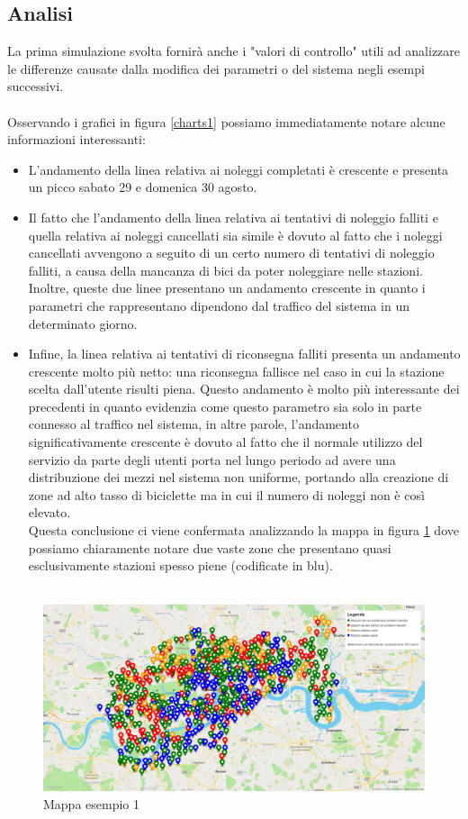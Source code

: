 \documentclass[a4paper, 12pt]{article}
\begin{document}
	\subsection{Analisi}
	La prima simulazione svolta fornirà anche i "valori di controllo" utili ad analizzare le differenze causate dalla modifica dei parametri o del sistema negli esempi successivi.\\\\
Osservando i grafici in figura \ref{charts1} possiamo immediatamente notare alcune informazioni interessanti:
	\begin{itemize}
	\item L'andamento della linea relativa ai noleggi completati è crescente e presenta un picco sabato 29 e domenica 30 agosto. 
	\item Il fatto che l'andamento della linea relativa ai tentativi di noleggio falliti e quella relativa ai noleggi cancellati sia simile è dovuto al fatto che i noleggi cancellati avvengono a seguito di un certo numero di tentativi di noleggio falliti, a causa della mancanza di bici da poter noleggiare nelle stazioni. Inoltre, queste due linee presentano un andamento crescente in quanto i parametri che rappresentano dipendono dal traffico del sistema in un determinato giorno. 
	\item Infine, la linea relativa ai tentativi di riconsegna falliti presenta un andamento crescente molto più netto: una riconsegna fallisce nel caso in cui la stazione scelta dall'utente risulti piena. Questo andamento è molto più interessante dei precedenti in quanto evidenzia come questo parametro sia solo in parte connesso al traffico nel sistema, in altre parole, l'andamento significativamente crescente è dovuto al fatto che il normale utilizzo del servizio da parte degli utenti porta nel lungo periodo ad avere una distribuzione dei mezzi nel sistema non uniforme, portando alla creazione di zone ad alto tasso di biciclette ma in cui il numero di noleggi non è così elevato.\\
Questa conclusione ci viene confermata analizzando la mappa in figura \ref{map1} dove possiamo chiaramente notare due vaste zone che presentano quasi esclusivamente stazioni spesso piene (codificate in blu).\\\\
	\end{itemize}
	\begin{figure}[H]
	\caption{Mappa esempio 1}
	\label{map1}
	\hfill \includegraphics[width=\textwidth]{resources/images/screenshot/MapExample1.png} \hspace*{\fill}
	\end{figure}	
\end{document}
